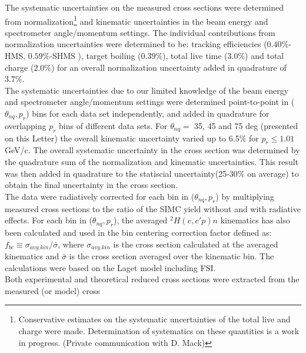 \indent The systematic uncertainties on the measured cross sections were determined from normalization\footnote{Conservative estimates on the systematic uncertainties of the total live and charge were made.
Determination of systematics on these quantities is a work in progress. (Private communication with D. Mack)} and kinematic uncertainties in the beam energy and spectrometer angle/momentum settings. The individual
contributions from normalization uncertainties were determined to be: tracking efficiencies ($0.40 \%$-HMS, $0.59 \%$-SHMS ), target boiling ($0.39 \%$), total live time ($3.0 \%$) and total charge ($2.0\%$)
for an overall normalization uncertainty added in quadrature of $3.7 \%$. \\
\indent The systematic uncertainties due to our limited knowledge of the beam energy and spectrometer angle/momentum settings were determined point-to-point in ($\theta_{nq}, p_{r}$) bins for each data set independently, and added in quadrature for overlapping $p_{r}$ bins
of different data sets. For $\theta_{nq}=$ 35, 45 and 75 deg (presented on this Letter) the overall kinematic uncertainty varied up to 6.5$\%$ for $p_{r}\leq1.01$ GeV/c.
The overall systematic uncertainty in the cross section was determined by the quadrature sum of the normalization and kinematic uncertainties. This result was then added in quadrature
to the statiscial uncertainty(25-30$\%$ on average) to obtain the final uncertainty in the cross section. \\
\indent The data were radiatively corrected for each bin in ($\theta_{nq}, p_{r}$) by multiplying measured cross sections to the ratio of the SIMC yield without and with radiative effects.
For each bin in ($\theta_{nq}, p_{r}$), the averaged $^{2}H(e,e'p)n$ kinematics has also been calculated and used in the bin centering correction factor defined as:
$f_{bc} \equiv \sigma_{avg.kin} / \bar{\sigma}$, where $\sigma_{avg.kin}$ is the cross section calculated at the averaged kinematics and $\bar{\sigma}$ is the cross
section averaged over the kinematic bin. The calculations were based on the Laget model including FSI\cite{LAGET2005, PhysRevC.21.861}.\\
\indent Both experimental and theoretical reduced cross sections were extracted from the measured (or model) cross 
\onecolumngrid
